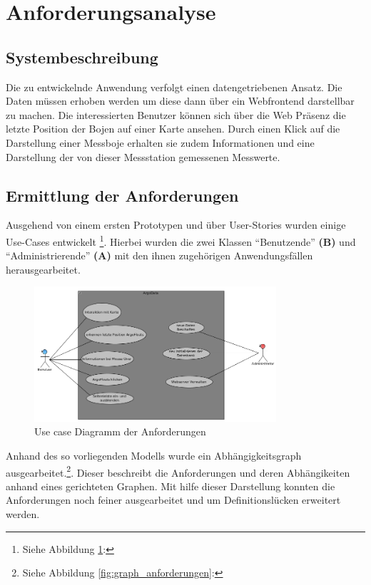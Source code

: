 \section{Anforderungsanalyse}

\subsection{Systembeschreibung}

    Die zu entwickelnde Anwendung verfolgt einen datengetriebenen Ansatz. Die Daten müssen erhoben werden um diese dann über ein Webfrontend darstellbar zu machen.  Die interessierten Benutzer  können sich über die Web Präsenz die letzte Position der Bojen auf einer Karte ansehen. Durch einen Klick auf die Darstellung einer Messboje erhalten sie zudem Informationen und eine Darstellung der von dieser Messstation gemessenen Messwerte.
    
    

    \subsection{Ermittlung der Anforderungen}
    
    Ausgehend von einem ersten Prototypen  und über User-Stories wurden einige Use-Cases entwickelt \footnote{Siehe Abbildung \ref{fig:use_case}: }.  Hierbei wurden die zwei Klassen "`Benutzende"' \textbf{(B)} und "`Administrierende"'  \textbf{(A)} mit den ihnen zugehörigen Anwendungsfällen herausgearbeitet. 
    
    \begin{figure}[h!]
        \centering
        \includegraphics[width=0.8\textwidth]{pix/use-case.png}
        \caption{Use case Diagramm der Anforderungen}
        \label{fig:use_case}
    \end{figure}
    
    Anhand des so vorliegenden Modells wurde ein Abhängigkeitsgraph ausgearbeitet.\footnote{Siehe Abbildung \ref{fig:graph_anforderungen}: }.  Dieser beschreibt die Anforderungen und deren Abhängikeiten anhand eines gerichteten Graphen. Mit hilfe dieser Darstellung konnten die Anforderungen noch feiner ausgearbeitet und um Definitionslücken erweitert werden.  
    
